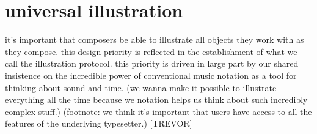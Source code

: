 \documentclass{article}
\begin{document}

\section{universal illustration}

it's important that composers be able to
illustrate all objects they work with as they compose. this design priority is
reflected in the establishment of what we call the illustration protocol. this
priority is driven in large part by our shared insistence on the incredible
power of conventional music notation as a tool for thinking about sound and
time. (we wanna make it possible to illustrate everything all the time because
we notation helps us think about such incredibly complex stuff.) (footnote: we
think it's important that users have access to all the features of the
underlying typesetter.) [TREVOR]
\end{document}

